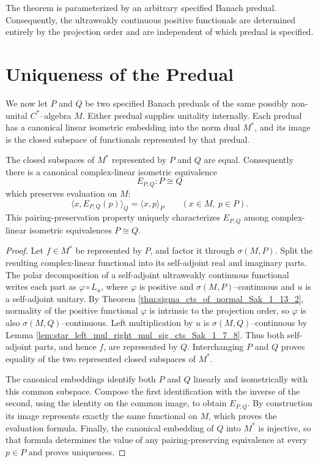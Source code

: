 The theorem is parameterized by an arbitrary specified Banach predual. Consequently, the
ultraweakly continuous positive functionals are determined entirely by the projection order and
are independent of which predual is specified.

\section{Uniqueness of the Predual}

We now let $P$ and $Q$ be two specified Banach preduals of the same possibly non-unital
$C^{*}$--algebra $M$. Either predual supplies unitality internally. Each predual has a canonical
linear isometric embedding into the norm dual $M^{*}$, and its image is the closed subspace of
functionals represented by that predual.

\begin{theorem}
  \label{thm:unique_predual}
  \leanok
  The closed subspaces of $M^{*}$ represented by $P$ and $Q$ are equal. Consequently there is a
  canonical complex-linear isometric equivalence
  \[
    E_{P,Q}:P\mathrel{\cong}Q
  \]
  which preserves evaluation on $M$:
  \[
    \langle x,E_{P,Q}(p)\rangle_{Q}=\langle x,p\rangle_{P}
    \qquad (x\in M,\ p\in P).
  \]
  This pairing-preservation property uniquely characterizes $E_{P,Q}$ among complex-linear
  isometric equivalences $P\cong Q$.
\end{theorem}

\begin{proof}
  \leanok
  Let $f\in M^{*}$ be represented by $P$, and factor it through $\sigma(M,P)$. Split the resulting
  complex-linear functional into its self-adjoint real and imaginary parts. The polar
  decomposition of a self-adjoint ultraweakly continuous functional writes each part as
  $\varphi\circ L_{u}$, where $\varphi$ is positive and $\sigma(M,P)$--continuous and $u$ is a
  self-adjoint unitary. By Theorem \ref{thm:sigma_cts_of_normal_Sak_1_13_2}, normality of the
  positive functional $\varphi$ is intrinsic to the projection order, so $\varphi$ is also
  $\sigma(M,Q)$--continuous. Left multiplication by $u$ is $\sigma(M,Q)$--continuous by Lemma
  \ref{lem:star_left_mul_right_mul_sig_cts_Sak_1_7_8}. Thus both self-adjoint parts, and hence
  $f$, are represented by $Q$. Interchanging $P$ and $Q$ proves equality of the two represented
  closed subspaces of $M^{*}$.

  The canonical embeddings identify both $P$ and $Q$ linearly and isometrically with this common
  subspace. Compose the first identification with the inverse of the second, using the identity on
  the common image, to obtain $E_{P,Q}$. By construction its image represents exactly the same
  functional on $M$, which proves the evaluation formula. Finally, the canonical embedding of
  $Q$ into $M^{*}$ is injective, so that formula determines the value of any pairing-preserving
  equivalence at every $p\in P$ and proves uniqueness.
\end{proof}
